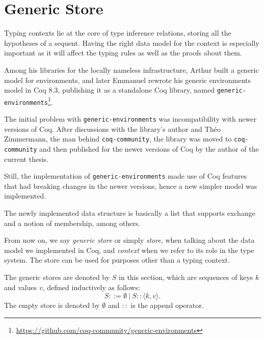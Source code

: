 \section{Generic Store}\label{chap:generic-store}

\newcommand{\angkv}{\langle k, v \rangle}
\newcommand{\angkvp}{\langle k', v' \rangle}

Typing contexts lie at the core of type inference relations, storing all the hypotheses of a sequent. Having the right data model for the context is especially important as it will affect the typing rules as well as the proofs about them.

Among his libraries for the locally nameless infrastructure, Arthur \cite{DBLP:journals/jar/Chargueraud12} built a generic model for environments, and later Emmanuel \cite{DBLP:journals/corr/abs-1112-1316} rewrote his generic environments model in Coq 8.3, publishing it as a standalone Coq library, named \texttt{generic-environments}\footnote{\url{https://github.com/coq-community/generic-environments}}.

The initial problem with \texttt{generic-environments} was incompatibility with newer versions of Coq. After discussions with the library's author and Th\'eo Zimmermann, the man behind \texttt{coq-community}, the library was moved to \texttt{coq-community} and then published for the newer versions of Coq by the author of the current thesis.

Still, the implementation of \texttt{generic-environments} made use of Coq features that had breaking changes in the newer versions, hence a new simpler model was implemented.

The newly implemented data structure is basically a list that supports exchange and a notion of membership, among others.

From now on, we say \textit{generic store} or simply \textit{store}, when talking about the data model we implemented in Coq, and \textit{context} when we refer to its role in the type system. The store can be used for purposes other than a typing context.

\begin{definition}
The generic stores are denoted by $S$ in this section, which are sequences of keys $k$ and values $v$, defined inductively as follows:
\begin{equation*}
S ::= \emptyset~|~S :: \angkv.
\end{equation*}
The empty store is denoted by $\emptyset$ and $::$ is the append operator.
\end{definition}


